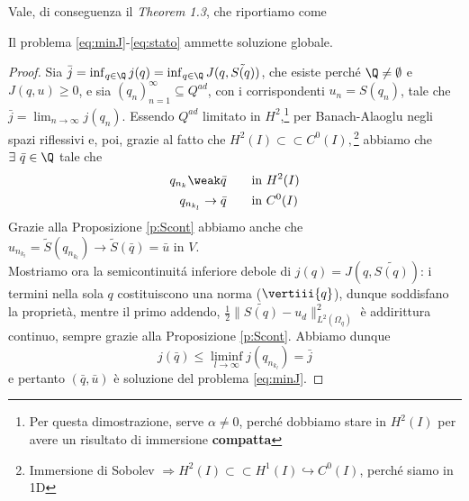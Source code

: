 Vale, di conseguenza il \emph{Theorem 1.3}, che riportiamo come
\begin{teor}[Esistenza]
 Il problema \eqref{eq:minJ}-\eqref{eq:stato} ammette soluzione globale.
\end{teor}
\begin{proof}
 Sia $\bar{j}=\inf_{q\in\Q}j(q)=\inf_{q\in\Q}J(q,\tilde{S(q)})$, che esiste perch\'e $\Q\neq\emptyset$ e $J(q,u)\geq0$, e sia $(q_n)_{n=1}^\infty \subseteq Q^{ad}$, con i corrispondenti $u_n=S(q_n)$, tale che $\bar{j}=\lim_{n\to\infty}j(q_n)$. Essendo $Q^{ad}$ limitato in $H^2$,\footnote{Per questa dimostrazione, serve $\alpha\neq0$, perch\'e dobbiamo stare in $H^2(I)$ per avere un risultato di immersione \textbf{compatta}} per Banach-Alaoglu negli spazi riflessivi e, poi, grazie al fatto che $H^2(I)\subset\subset C^0(I),$\footnote{Immersione di Sobolev $\Rightarrow H^2(I)\subset\subset H^1(I)\hookrightarrow C^0(I)$, perch\'e siamo in 1D} abbiamo che $\exists\ \bar{q}\in \Q$ tale che
\begin{equation*}
\begin{aligned}
 q_{n_k} \weak \bar{q}\qquad &\text{in } H^2(I)\\
 q_{n_{k_l}} \rightarrow \bar{q}\qquad &\text{in } C^0(I)
\end{aligned}
\end{equation*}
Grazie alla Proposizione \ref{p:Scont} abbiamo anche che $u_{n_{k_l}}=\tilde{S}(q_{n_{k_l}}) \rightarrow \tilde{S}(\bar{q})=\bar{u}\text{  in } V$.\\
Mostriamo ora la semicontinuit\'a inferiore debole di $j(q)=J(q,\tilde{S(q)})$: i termini nella sola $q$ costituiscono una norma ($\vertiii{q}$), dunque soddisfano la propriet\`a, mentre il primo addendo, $\frac{1}{2}\|\tilde{S(q)}-u_d\|^2_{L^2(\Omega_q)}$ \`e addirittura continuo, sempre grazie alla Proposizione \ref{p:Scont}.
Abbiamo dunque $$j(\bar{q})\leq\liminf_{l \to \infty} j(q_{n_{k_l}})=\bar{j}$$
e pertanto $(\bar{q},\bar{u})$ \`e soluzione del problema \eqref{eq:minJ}.
\end{proof}

